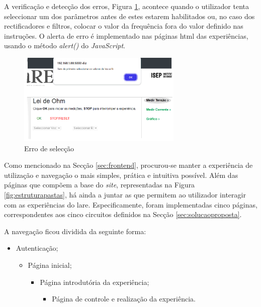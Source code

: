 A verificação e detecção dos erros, Figura \ref{fig:erropagina}, acontece quando o utilizador tenta seleccionar um dos parâmetros antes de estes estarem habilitados ou, no caso dos rectificadores e filtros, colocar o valor da frequência fora do valor definido nas instruções. O alerta de erro é implementado nas páginas \acrshort{html} das experiências, usando o método \textit{alert()} do \textit{JavaScript}.

\begin{figure}[hbtp]
	\centering
	\includegraphics[width=0.7\textwidth]{figures/erro_pagina.png}
	\caption{Erro de selecção}
	\label{fig:erropagina}
\end{figure}

Como mencionado na Secção \ref{sec:frontend}, procurou-se manter a experiência de utilização e navegação o mais simples, prática e intuitiva possível. Além das páginas que compõem a base do \textit{site}, representadas na Figura \ref{fig:estruturapastas}, há ainda a juntar as que permitem ao utilizador interagir com as experiências do \acrshort{lare}. Especificamente, foram implementadas cinco páginas, correspondentes aos cinco circuitos definidos na Secção \ref{sec:solucaoproposta}.

A navegação ficou dividida da seguinte forma:
\begin{itemize}
	\item Autenticação;
	\begin{itemize}
		\item Página inicial;
		\begin{itemize}
			\item Página introdutória da experiência;
			\begin{itemize}
				\item Página de controle e realização da experiência.
			\end{itemize}
		\end{itemize}
	\end{itemize}
\end{itemize}


